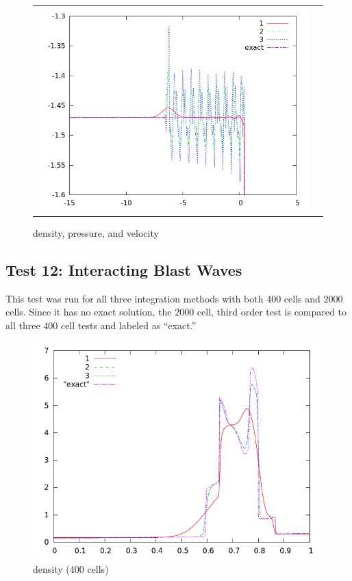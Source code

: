 \documentclass[letterpaper,12pt]{article}
\begin{document}
\begin{figure}[h]
\begin{center}
\begin{tabular}{cc}
      \includegraphics[width=.4\textwidth]{vel11zoom.png} \\
	\end{tabular}	
  \end{center}
  \caption{density, pressure, and velocity}
\end{figure}

\clearpage

\subsection{Test 12: Interacting Blast Waves}
This test was run for all three integration methods with both 400 cells and 2000 cells. Since it has no exact solution, the 2000 cell, third order test is compared to all three 400 cell tests and labeled as ``exact.''

\begin{figure}[h]
  \begin{center}
     \includegraphics[width=.78\textwidth]{den_T12_400.png}	
  \end{center}
  \caption{density (400 cells)}
\end{figure}
\end{document}
